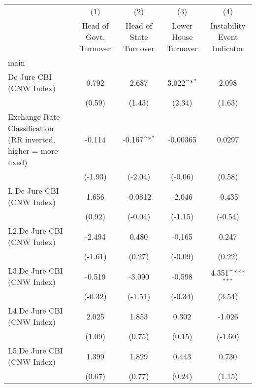 {
\def\sym#1{\ifmmode^{#1}\else\(^{#1}\)\fi}
\begin{tabular}{l*{4}{c}}
\hline\hline
                &\multicolumn{1}{c}{(1)}&\multicolumn{1}{c}{(2)}&\multicolumn{1}{c}{(3)}&\multicolumn{1}{c}{(4)}\\
                &\multicolumn{1}{c}{Head of Govt. Turnover}&\multicolumn{1}{c}{Head of State Turnover}&\multicolumn{1}{c}{Lower House Turnover}&\multicolumn{1}{c}{Instability Event Indicator}\\
\hline
main            &                  &                  &                  &                  \\
De Jure CBI (CNW Index)&    0.792         &    2.687         &    3.022\sym{*}  &    2.098         \\
                &   (0.59)         &   (1.43)         &   (2.34)         &   (1.63)         \\
[1em]
Exchange Rate Classification (RR inverted, higher = more fixed)&   -0.114         &   -0.167\sym{*}  & -0.00365         &   0.0297         \\
                &  (-1.93)         &  (-2.04)         &  (-0.06)         &   (0.58)         \\
[1em]
L.De Jure CBI (CNW Index)&    1.656         &  -0.0812         &   -2.046         &   -0.435         \\
                &   (0.92)         &  (-0.04)         &  (-1.15)         &  (-0.54)         \\
[1em]
L2.De Jure CBI (CNW Index)&   -2.494         &    0.480         &   -0.165         &    0.247         \\
                &  (-1.61)         &   (0.27)         &  (-0.09)         &   (0.22)         \\
[1em]
L3.De Jure CBI (CNW Index)&   -0.519         &   -3.090         &   -0.598         &    4.351\sym{***}\\
                &  (-0.32)         &  (-1.51)         &  (-0.34)         &   (3.54)         \\
[1em]
L4.De Jure CBI (CNW Index)&    2.025         &    1.853         &    0.302         &   -1.026         \\
                &   (1.09)         &   (0.75)         &   (0.15)         &  (-1.60)         \\
[1em]
L5.De Jure CBI (CNW Index)&    1.399         &    1.829         &    0.443         &    0.730         \\
                &   (0.67)         &   (0.77)         &   (0.24)         &   (1.15)         \\

\end{tabular}}
